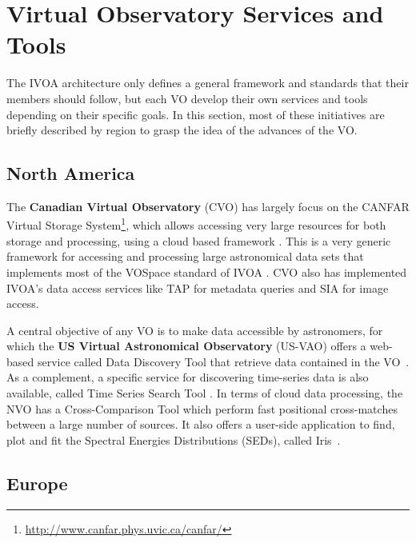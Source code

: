 \section{Virtual Observatory Services and Tools}

The IVOA architecture only defines a general framework and
standards that their members should follow, but each VO develop
their own services and tools depending on their specific goals.
In this section, most of these initiatives are briefly
described by region to grasp the idea of the advances of
the VO.

\subsection{North America}


The \textbf{Canadian Virtual Observatory} (CVO) has largely focus on the CANFAR Virtual Storage
System\footnote{\url{http://www.canfar.phys.uvic.ca/canfar/}}, which
allows accessing very large resources for both storage and processing, 
using a cloud based framework \cite{}. 
This is a very generic framework for accessing and processing 
large astronomical data sets that implements most of the
VOSpace standard of IVOA \cite{VOSPace}. CVO also has implemented
IVOA's data access services like TAP for metadata queries 
and SIA for
image access.

A central objective of any VO is to make data accessible by astronomers,
for which the \textbf{US Virtual Astronomical Observatory} (US-VAO) 
offers a web-based service called Data Discovery Tool 
that retrieve data contained in the VO~\cite{}. 
As a complement, a specific service for discovering time-series data
is also available, called Time Series Search Tool \cite{}.
In terms of cloud data processing, the NVO has a Cross-Comparison Tool 
which perform fast positional cross-matches between a large number of 
sources.
It also offers a user-side application to find, plot and fit the
Spectral Energies Distributions (SEDs), called Iris~\cite{}.

\subsection{Europe}

